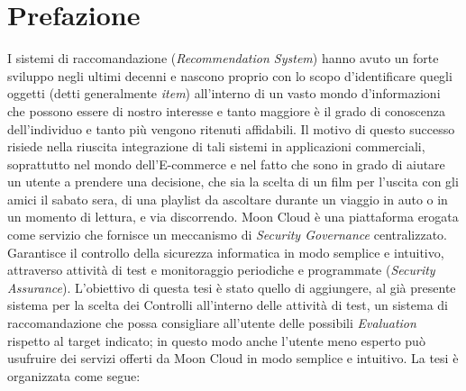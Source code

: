 \chapter{Prefazione}\label{chp:00-prefaction}
I sistemi di raccomandazione (\textit{Recommendation System}) hanno avuto un forte sviluppo negli ultimi decenni e 
nascono proprio con lo scopo d'identificare quegli oggetti (detti generalmente \textit{item}) all'interno di un vasto 
mondo d'informazioni che possono essere di nostro interesse e tanto maggiore è il grado di conoscenza dell'individuo 
e tanto più vengono ritenuti affidabili.\hfill\break
Il motivo di questo successo risiede nella riuscita integrazione di tali sistemi in applicazioni commerciali, 
soprattutto nel mondo dell’E-commerce e nel fatto che sono in grado di aiutare un utente a prendere una decisione, che sia la scelta di 
un film per l'uscita con gli amici il sabato sera, di una playlist da ascoltare durante un viaggio in auto o in un momento di lettura, 
e via discorrendo.\hfill\break
Moon Cloud è una piattaforma erogata come servizio che fornisce un meccanismo di \textit{Security Governance} centralizzato. 
Garantisce il controllo della sicurezza informatica in modo semplice e intuitivo, attraverso attività di test e monitoraggio 
periodiche e programmate (\textit{Security Assurance}). L'obiettivo di questa tesi è stato quello di aggiungere, al già 
presente sistema per la scelta dei Controlli all'interno delle attività di test, un sistema di raccomandazione che possa 
consigliare all'utente delle possibili \textit{Evaluation} rispetto al target indicato; in questo modo anche l'utente meno esperto può 
usufruire dei servizi offerti da Moon Cloud in modo semplice e intuitivo.
\vspace{0.5 cm}
\hfill\break
La tesi è organizzata come segue:

